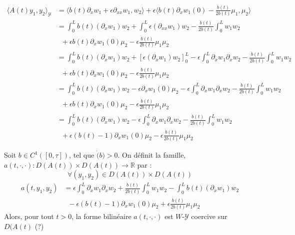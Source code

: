 \documentclass[a4paper]{article}
\newcommand{\dep}{b}
\begin{document}
 \[
 \begin{split}
 \displaystyle	\langle A(t) y_1,y_2\rangle_{\mathscr{Y}} 
	                   & =  \langle b(t) \partial_x w_1 + \epsilon \partial_{xx} w_1 
					  ,w_2\rangle
 					  + \epsilon \langle  b(t) \partial_x w_1(0) 
					  - \frac{\dot{b}(t)}{2b(t)} \mu_1,\mu_2 \rangle \\					  
                      &= \int_0^L \dep (t) (\partial_x w_1)w_2
                       + \int_0^L \epsilon (\partial_{xx} w_1)w_2
					    - \frac{\dot{b} (t) }{2b(t) } \int_0^L w_1w_2\\
					   & \; \; + \epsilon b(t) \partial_x w_1(0) \mu_2 
                       - \epsilon \frac{\dot{\dep}(t)}{2b(t)} \mu_1\mu_2\\					   
 					  & = \int_0^L \dep(t) (\partial_xw_1)w_2
 						  + [\epsilon (\partial_x w_1)w_2]_0^L 
 						  - \epsilon \int_0^L \partial_xw_1 \partial_xw_2
						  - \frac{\dot{b} (t) }{2b(t) } \int_0^L w_1w_2 \\
   					      & \; \; + \epsilon b(t) \partial_x w_1(0) \mu_2 
                          - \epsilon \frac{\dot{\dep}(t)}{2b(t)} \mu_1\mu_2\\
 						& = \int_0^L \dep (t) (\partial_xw_1)w_2
						   - \epsilon \partial_xw_1(0) \mu_2
						  -  \epsilon\int_0^L \partial_xw_1 \partial_xw_2
 					    - \frac{\dot{b} (t) }{2b(t) } \int_0^L w_1w_2 \\
 					   &\; \; + \epsilon b(t) \partial_x w_1(0) \mu_2 
                        - \epsilon \frac{\dot{\dep}(t)}{2b(t)} \mu_1\mu_2\\  						
  						& = \int_0^L \dep (t) (\partial_xw_1)w_2
						 -  \epsilon\int_0^L \partial_xw_1 \partial_xw_2
 					    - \frac{\dot{b} (t) }{2b(t) } \int_0^L w_1w_2 \\
 					   & \; \; + \epsilon (b(t)-1) \partial_x w_1(0) \mu_2 
                        - \epsilon \frac{\dot{\dep}(t)}{2b(t)} \mu_1\mu_2   
\end{split}
\]

\begin{lemme}
	Soit $b \in C^1([0,\tau])$, tel que $\dot(b)>0$.
 	On définit la famille,
	$a(t,\cdot, \cdot): D(A(t)) \times D(A(t)) \to \mathbb{R}$ par :
 	\[
 	\forall (y_1,y_2) \in D(A(t)) \times D(A(t))
	\]
	\begin{equation}
		\label{def:a3}
		\begin{split}
		 a(t,y_1,y_2) &=   \epsilon \int_0^L \partial_xw_1 \partial_xw_2
		                + \frac{\dot{b} (t) }{2b(t) } \int_0^L w_1w_2
		                - \int_0^L \dep (t) (\partial_xw_1)w_2 \\
						& \; \; - \epsilon (b(t)-1) \partial_x w_1(0) \mu_2
                        + \epsilon \displaystyle \frac{\dot{\dep}(t)}{2b(t)}\mu_1\mu_2
		\end{split}
	\end{equation}
	Alors, pour tout $t>0$, la forme bilinéaire $a(t, \cdot, \cdot)$ est $W$-$\mathscr{Y}$ coercive sur $D(A(t)$ (?)
\end{lemme}
\end{document}
